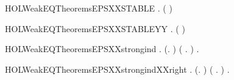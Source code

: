 \newcommand{\HOLWeakEQTheoremsEPSXXRESTR}{\UseVerbatim{HOLWeakEQTheoremsEPSXXRESTR}}
\begin{SaveVerbatim}{HOLWeakEQTheoremsEPSXXSTABLE}
\HOLTokenTurnstile{} \HOLSymConst{\HOLTokenForall{}} .    \HOLSymConst{\HOLTokenImp{}}   \HOLSymConst{\HOLTokenImp{}} ( \HOLSymConst{=} )
\end{SaveVerbatim}
\newcommand{\HOLWeakEQTheoremsEPSXXSTABLE}{\UseVerbatim{HOLWeakEQTheoremsEPSXXSTABLE}}
\begin{SaveVerbatim}{HOLWeakEQTheoremsEPSXXSTABLEYY}
\HOLTokenTurnstile{} \HOLSymConst{\HOLTokenForall{}} .    \HOLSymConst{\HOLTokenConj{}}   \HOLSymConst{\HOLTokenImp{}} ( \HOLSymConst{=} )
\end{SaveVerbatim}
\newcommand{\HOLWeakEQTheoremsEPSXXSTABLEYY}{\UseVerbatim{HOLWeakEQTheoremsEPSXXSTABLEYY}}
\begin{SaveVerbatim}{HOLWeakEQTheoremsEPSXXstrongind}
\HOLTokenTurnstile{} \HOLSymConst{\HOLTokenForall{}}.
       (\HOLSymConst{\HOLTokenForall{}}.   ) \HOLSymConst{\HOLTokenConj{}} (\HOLSymConst{\HOLTokenForall{}}  .  \HOLTokenTransBegin\HOLConst{\ensuremath{\tau}}\HOLTokenTransEnd {} \HOLSymConst{\HOLTokenConj{}}    \HOLSymConst{\HOLTokenConj{}}    \HOLSymConst{\HOLTokenImp{}}   ) \HOLSymConst{\HOLTokenImp{}}
       \HOLSymConst{\HOLTokenForall{}} .    \HOLSymConst{\HOLTokenImp{}}   
\end{SaveVerbatim}
\newcommand{\HOLWeakEQTheoremsEPSXXstrongind}{\UseVerbatim{HOLWeakEQTheoremsEPSXXstrongind}}
\begin{SaveVerbatim}{HOLWeakEQTheoremsEPSXXstrongindXXright}
\HOLTokenTurnstile{} \HOLSymConst{\HOLTokenForall{}}.
       (\HOLSymConst{\HOLTokenForall{}}.   ) \HOLSymConst{\HOLTokenConj{}} (\HOLSymConst{\HOLTokenForall{}}  .    \HOLSymConst{\HOLTokenConj{}}    \HOLSymConst{\HOLTokenConj{}}  \HOLTokenTransBegin\HOLConst{\ensuremath{\tau}}\HOLTokenTransEnd {} \HOLSymConst{\HOLTokenImp{}}   ) \HOLSymConst{\HOLTokenImp{}}
       \HOLSymConst{\HOLTokenForall{}} .    \HOLSymConst{\HOLTokenImp{}}   
\end{SaveVerbatim}
